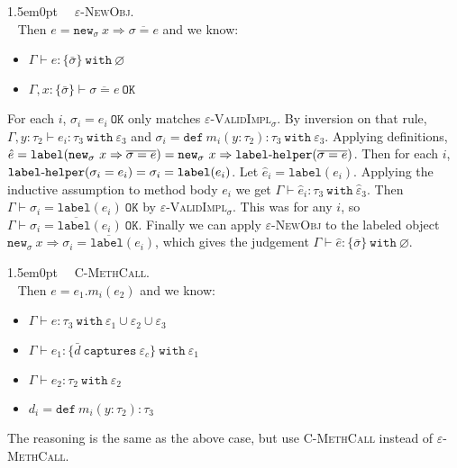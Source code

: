 \documentclass{llncs}
\newcommand{\keywadj}[1]{\mathtt{#1}}
\newcommand{\keyw}[1]{\keywadj{#1}~}
\newcommand{\kwa}[1]{\keywadj{ #1 }}
\newcommand{\hyphen}{\hbox{-}}
\newcommand{\proofcase}[2]{
	\begin{adjustwidth}{1.5em}{0pt}
		\fbox{Case.}~~#1. \\ ~#2
	\end{adjustwidth}
}
\newcommand{\type}[2]{
	#1~\keyw{with} #2
}
\newcommand{\newsig}[0]{
	\keywadj{new}_\sigma~x \Rightarrow \overline{\sigma = e}
}
\begin{document}
{\proofcase{\textsc{$\varepsilon$-NewObj}}{
Then $e = \newsig$ and we know:
\begin{itemize}
	\item $\Gamma \vdash e : \type{ \{ \bar \sigma \} }{\varnothing}$
	\item $\Gamma, x : \{ \bar \sigma \} \vdash \overline{ \sigma = e }~\keyw{OK}$
\end{itemize}
For each $i$, $\sigma_i = e_i~\keywadj{OK}$ only matches \textsc{$\varepsilon$-ValidImpl$_\sigma$}. By inversion on that rule, $\Gamma, y : \tau_2 \vdash e_i: \tau_3~\keyw{with} \varepsilon_3$ and $\sigma_i = \keyw{def} m_i(y : \tau_2) : \tau_3~\keyw{with} \varepsilon_3$. Applying definitions, $\hat e = \keywadj{label}(\newsig) = \keywadj{new}_\sigma~x \Rightarrow \keywadj{label \hyphen helper}(\overline{\sigma = e})$. Then for each $i$, 
 $\keywadj{label \hyphen helper}(\sigma_i = e _i) = \sigma_i = \keywadj{label}(e_i)$. Let $\hat e_i = \keywadj{label}(e_i)$. Applying the inductive assumption to method body $e_i$ we get $\Gamma \vdash \hat e_i : \type{\tau_3}{\hat \varepsilon_3}$. Then $\Gamma \vdash \sigma_i = \keywadj{label}(e_i)~\keywadj{OK}$ by \textsc{$\varepsilon$-ValidImpl$_\sigma$}. This was for any $i$, so $\Gamma \vdash \overline{ \sigma_i = \keywadj{label}(e_i) }~\keywadj{OK}$. Finally we can apply \textsc{$\varepsilon$-NewObj} to the labeled object $\kwa{new}_\sigma~x\Rightarrow \overline{ \sigma_i = \keywadj{label}(e_i) }$, which gives the judgement $\Gamma \vdash \hat e : \{ \bar \sigma \}~\keyw{with} \varnothing$.\\
}

\proofcase{\textsc{C-MethCall}} {
Then $e = e_1.m_i(e_2)$ and we know:
\begin{itemize}
	\item $\Gamma \vdash e : \type{\tau_3}{\varepsilon_1 \cup \varepsilon_2 \cup \varepsilon_3}$
	\item $\Gamma \vdash e_1 : \{ \bar d~\keyw{captures} \varepsilon_c \}~\keyw{with} \varepsilon_1$
	\item $\Gamma \vdash e_2 : \type{\tau_2}{\varepsilon_2}$
	\item $d_i = \keyw{def} m_i(y : \tau_2) : \tau_3$ 
\end{itemize}
The reasoning is the same as the above case, but use \textsc{C-MethCall} instead of \textsc{$\varepsilon$-MethCall}.\\
}

}
\end{document}
